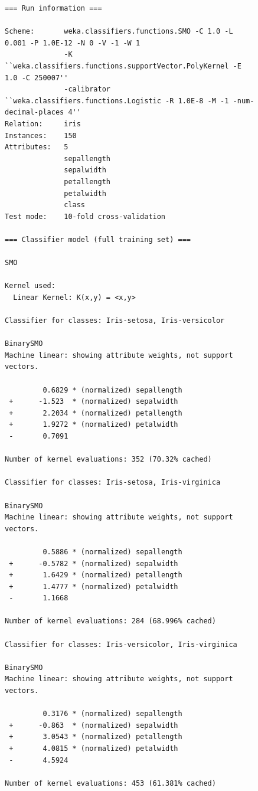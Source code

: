 \begin{figure}[!p]
\begin{mdframed}[innermargin=-1.0cm]
\begin{Verbatim}[fontsize=\tiny]
=== Run information ===

Scheme:       weka.classifiers.functions.SMO -C 1.0 -L 0.001 -P 1.0E-12 -N 0 -V -1 -W 1 
              -K ``weka.classifiers.functions.supportVector.PolyKernel -E 1.0 -C 250007'' 
              -calibrator ``weka.classifiers.functions.Logistic -R 1.0E-8 -M -1 -num-decimal-places 4''
Relation:     iris
Instances:    150
Attributes:   5
              sepallength
              sepalwidth
              petallength
              petalwidth
              class
Test mode:    10-fold cross-validation

=== Classifier model (full training set) ===

SMO

Kernel used:
  Linear Kernel: K(x,y) = <x,y>

Classifier for classes: Iris-setosa, Iris-versicolor

BinarySMO
Machine linear: showing attribute weights, not support vectors.

         0.6829 * (normalized) sepallength
 +      -1.523  * (normalized) sepalwidth
 +       2.2034 * (normalized) petallength
 +       1.9272 * (normalized) petalwidth
 -       0.7091

Number of kernel evaluations: 352 (70.32% cached)

Classifier for classes: Iris-setosa, Iris-virginica

BinarySMO
Machine linear: showing attribute weights, not support vectors.

         0.5886 * (normalized) sepallength
 +      -0.5782 * (normalized) sepalwidth
 +       1.6429 * (normalized) petallength
 +       1.4777 * (normalized) petalwidth
 -       1.1668

Number of kernel evaluations: 284 (68.996% cached)

Classifier for classes: Iris-versicolor, Iris-virginica

BinarySMO
Machine linear: showing attribute weights, not support vectors.

         0.3176 * (normalized) sepallength
 +      -0.863  * (normalized) sepalwidth
 +       3.0543 * (normalized) petallength
 +       4.0815 * (normalized) petalwidth
 -       4.5924

Number of kernel evaluations: 453 (61.381% cached)


\end{Verbatim}
\end{mdframed}
\end{figure}
